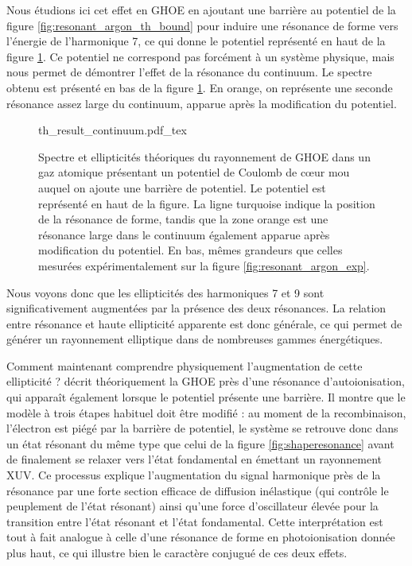 Nous étudions ici cet effet en GHOE en ajoutant une barrière au potentiel de la figure \ref{fig:resonant_argon_th_bound} pour induire une résonance de forme vers l'énergie de l'harmonique 7, ce qui donne le potentiel représenté en haut de la figure \ref{fig:resonant_argon_th_continuum}. Ce potentiel ne correspond pas forcément à un système physique, mais nous permet de démontrer l'effet de la résonance du continuum. Le spectre obtenu est présenté en bas de la figure \ref{fig:resonant_argon_th_continuum}. En orange, on représente une seconde résonance assez large du continuum, apparue après la modification du potentiel.

\begin{figure}[!ht]
\centering
\def\svgwidth{1\columnwidth}
{th_result_continuum.pdf_tex}
\caption{Spectre et ellipticités théoriques du rayonnement de GHOE dans un gaz atomique présentant un potentiel de Coulomb de cœur mou auquel on ajoute une barrière de potentiel. Le potentiel est représenté en haut de la figure. La ligne turquoise indique la position de la résonance de forme, tandis que la zone orange est une résonance large dans le continuum également apparue après modification du potentiel. En bas, mêmes grandeurs que celles mesurées expérimentalement sur la figure \ref{fig:resonant_argon_exp}.}
\label{fig:resonant_argon_th_continuum}
\end{figure}

Nous voyons donc que les ellipticités des harmoniques 7 et 9 sont significativement augmentées par la présence des deux résonances. La relation entre résonance et haute ellipticité apparente est donc générale, ce qui permet de générer un rayonnement elliptique dans de nombreuses gammes énergétiques. 

Comment maintenant comprendre physiquement l'augmentation de cette ellipticité ?  décrit théoriquement la GHOE près d'une résonance d'autoionisation, qui apparaît également lorsque le potentiel présente une barrière. Il montre que le modèle à trois étapes habituel doit être modifié : au moment de la recombinaison, l'électron est piégé par la barrière de potentiel, le système se retrouve donc dans un état résonant du même type que celui de la figure \ref{fig:shaperesonance} avant de finalement se relaxer vers l'état fondamental en émettant un rayonnement XUV. Ce processus explique l'augmentation du signal harmonique près de la résonance par une forte section efficace de diffusion inélastique (qui contrôle le peuplement de l'état résonant) ainsi qu'une force d'oscillateur élevée pour la transition entre l'état résonant et l'état fondamental.
Cette interprétation est tout à fait analogue à celle d'une résonance de forme en photoionisation donnée plus haut, ce qui illustre bien le caractère conjugué de ces deux effets.

